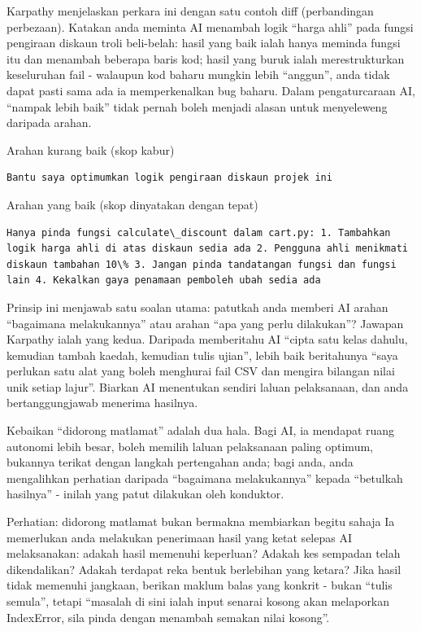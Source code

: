 Karpathy menjelaskan perkara ini dengan satu contoh diff (perbandingan perbezaan). Katakan anda meminta AI menambah logik “harga ahli” pada fungsi pengiraan diskaun troli beli-belah: hasil yang baik ialah hanya meminda fungsi itu dan menambah beberapa baris kod; hasil yang buruk ialah merestrukturkan keseluruhan fail - walaupun kod baharu mungkin lebih “anggun”, anda tidak dapat pasti sama ada ia memperkenalkan bug baharu. Dalam pengaturcaraan AI, “nampak lebih baik” tidak pernah boleh menjadi alasan untuk menyeleweng daripada arahan.

Arahan kurang baik (skop kabur)

\begin{lstlisting}
Bantu saya optimumkan logik pengiraan diskaun projek ini
\end{lstlisting}

Arahan yang baik (skop dinyatakan dengan tepat)

\begin{lstlisting}
Hanya pinda fungsi calculate\_discount dalam cart.py: 1. Tambahkan logik harga ahli di atas diskaun sedia ada 2. Pengguna ahli menikmati diskaun tambahan 10\% 3. Jangan pinda tandatangan fungsi dan fungsi lain 4. Kekalkan gaya penamaan pemboleh ubah sedia ada
\end{lstlisting}


Prinsip ini menjawab satu soalan utama: patutkah anda memberi AI arahan “bagaimana melakukannya” atau arahan “apa yang perlu dilakukan”? Jawapan Karpathy ialah yang kedua. Daripada memberitahu AI “cipta satu kelas dahulu, kemudian tambah kaedah, kemudian tulis ujian”, lebih baik beritahunya “saya perlukan satu alat yang boleh menghurai fail CSV dan mengira bilangan nilai unik setiap lajur”. Biarkan AI menentukan sendiri laluan pelaksanaan, dan anda bertanggungjawab menerima hasilnya.

Kebaikan “didorong matlamat” adalah dua hala. Bagi AI, ia mendapat ruang autonomi lebih besar, boleh memilih laluan pelaksanaan paling optimum, bukannya terikat dengan langkah pertengahan anda; bagi anda, anda mengalihkan perhatian daripada “bagaimana melakukannya” kepada “betulkah hasilnya” - inilah yang patut dilakukan oleh konduktor.

\begin{tcbwarn}{Perhatian: didorong matlamat bukan bermakna membiarkan begitu sahaja}
Ia memerlukan anda melakukan penerimaan hasil yang ketat selepas AI melaksanakan: adakah hasil memenuhi keperluan? Adakah kes sempadan telah dikendalikan? Adakah terdapat reka bentuk berlebihan yang ketara? Jika hasil tidak memenuhi jangkaan, berikan maklum balas yang konkrit - bukan “tulis semula”, tetapi “masalah di sini ialah input senarai kosong akan melaporkan IndexError, sila pinda dengan menambah semakan nilai kosong”.

\end{tcbwarn}

